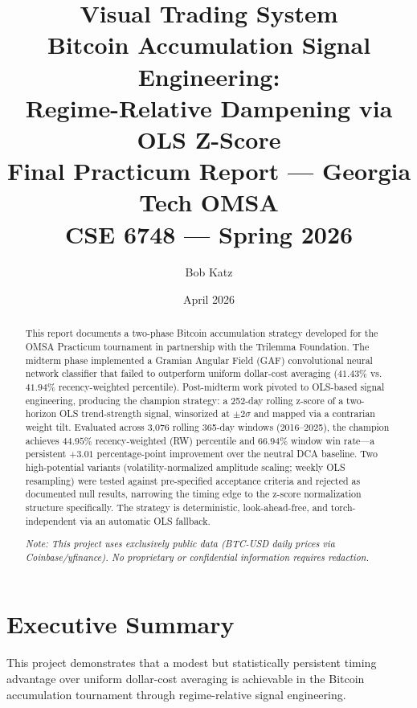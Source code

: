 \documentclass[11pt,letterpaper]{article}
\title{\textbf{Visual Trading System}\\[0.4em]
  {\large Bitcoin Accumulation Signal Engineering:\\[0.2em]
   Regime-Relative Dampening via OLS Z-Score}\\[0.8em]
  {\normalsize Final Practicum Report --- Georgia Tech OMSA}\\[0.2em]
  {\small CSE 6748 --- Spring 2026}}
\author{Bob Katz}
\date{April 2026}
\begin{document}

\maketitle
\thispagestyle{empty}

\begin{abstract}
\noindent
This report documents a two-phase Bitcoin accumulation strategy developed for the
OMSA Practicum tournament in partnership with the Trilemma Foundation.  The
midterm phase implemented a Gramian Angular Field (GAF) convolutional neural
network classifier that failed to outperform uniform dollar-cost averaging
($41.43\%$ vs.\ $41.94\%$ recency-weighted percentile).  Post-midterm work
pivoted to OLS-based signal engineering, producing the champion strategy: a
252-day rolling z-score of a two-horizon OLS trend-strength signal, winsorized at
$\pm2\sigma$ and mapped via a contrarian weight tilt.  Evaluated across 3,076
rolling 365-day windows (2016--2025), the champion achieves $\mathbf{44.95\%}$
recency-weighted (RW) percentile and $66.94\%$ window win rate---a persistent
$+3.01$ percentage-point improvement over the neutral DCA baseline.  Two
high-potential variants (volatility-normalized amplitude scaling; weekly OLS
resampling) were tested against pre-specified acceptance criteria and rejected as
documented null results, narrowing the timing edge to the z-score normalization
structure specifically.  The strategy is deterministic, look-ahead-free, and
torch-independent via an automatic OLS fallback.

\medskip\noindent\textit{Note: This project uses exclusively public data
(BTC-USD daily prices via Coinbase/yfinance).  No proprietary or confidential
information requires redaction.}
\end{abstract}

\tableofcontents
\clearpage

\section{Executive Summary}

This project demonstrates that a modest but statistically persistent timing
advantage over uniform dollar-cost averaging is achievable in the Bitcoin
accumulation tournament through regime-relative signal engineering.
\end{document}
